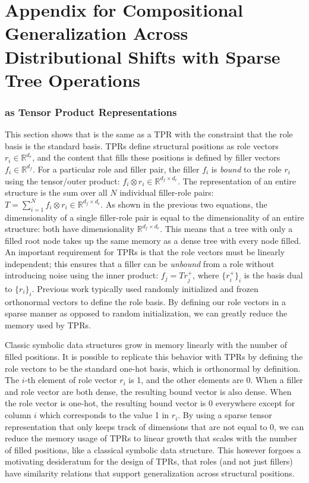 \chapter{Appendix for Compositional Generalization Across Distributional Shifts with Sparse Tree Operations} \label{chap:appendix-c}

\subsection{\fullrepname as Tensor Product Representations} \label{sec:sdtm-appendix-sparse-tprs}
This section shows that \fullrepname is the same as a TPR with the constraint that the role basis is the standard basis. TPRs define structural positions as role vectors $r_i \in \mathbb{R}^{d_r}$, and the content that fills these positions is defined by filler vectors $f_i \in \mathbb{R}^{d_f}$. For a particular role and filler pair, the filler $f_i$ is \textit{bound} to the role $r_i$ using the tensor/outer product: $f_i \otimes r_i \in \mathbb{R}^{d_f \times d_r}$. The representation of an entire structure is the sum over all $N$ individual filler-role pairs: $T = \sum_{i=1}^N f_i \otimes r_i  \in \mathbb{R}^{d_f \times d_r}$. As shown in the previous two equations, the dimensionality of a single filler-role pair is equal to the dimensionality of an entire structure: both have dimensionality $\mathbb{R}^{d_f \times d_r}$. This means that a tree with only a filled root node takes up the same memory as a dense tree with every node filled. An important requirement for TPRs is that the role vectors must be linearly independent; this ensures that a filler can be \textit{unbound} from a role without introducing noise using the inner product: $f_j = Tr^+_j$, where $\{r^+_i\}_i$ is the basis dual to $\{r_i\}_i$. Previous work typically used randomly initialized and frozen orthonormal vectors to define the role basis. By defining our role vectors in a sparse manner as opposed to random initialization, we can greatly reduce the memory used by TPRs.

Classic symbolic data structures grow in memory linearly with the number of filled positions.  It is possible to replicate this behavior with TPRs by defining the role vectors to be the standard one-hot basis, which is orthonormal by definition. The $i$-th element of role vector $r_i$ is 1, and the other elements are 0. When a filler and role vector are both dense, the resulting bound vector is also dense. When the role vector is one-hot, the resulting bound vector is 0 everywhere except for column $i$ which corresponds to the value 1 in $r_i$. By using a sparse tensor representation that only keeps track of dimensions that are not equal to 0, we can reduce the memory usage of TPRs to linear growth that scales with the number of filled positions, like a classical symbolic data structure. This however forgoes a motivating desideratum for the design of TPRs, that roles (and not just fillers) have similarity relations that support generalization across structural positions.

